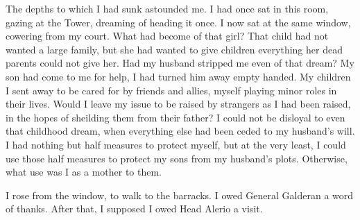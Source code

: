 \documentclass{article}
\begin{document}
The depths to which I had sunk astounded me. I had once sat in this room, gazing at the Tower, dreaming of heading it once. I now sat at the same window, cowering from my court. What had become of that girl? That child had not wanted a large family, but she had wanted to give children everything her dead parents could not give her. Had my husband stripped me even of that dream? My son had come to me for help, I had turned him away empty handed. My children I sent away to be cared for by friends and allies, myself playing minor roles in their lives. Would I leave my issue to be raised by strangers as I had been raised, in the hopes of sheilding them from their father? I could not be disloyal to even that childhood dream, when everything else had been ceded to my husband's will. I had nothing but half measures to protect myself, but at the very least, I could use those half measures to protect my sons from my husband's plots. Otherwise, what use was I as a mother to them.

I rose from the window, to walk to the barracks. I owed General Galderan a word of thanks. After that, I supposed I owed Head Alerio a visit.

\vspace{.5cm}
\end{document}
